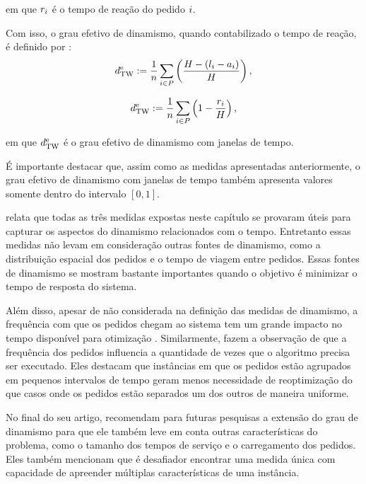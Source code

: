 \noindent em que $r_i$ é o tempo de reação do pedido
$i$.

Com isso, o grau efetivo de dinamismo, quando contabilizado o tempo de reação,
é definido por \cite{larsen_dynamic_2000}:
%
%
\begin{equation}
  d^\text{e}_\text{TW} := 
  \frac{1}{n}
  \sum_{i \in P}
  {
    \left(
    \frac{H - (l_i
                             - a_i)}
         {H}
    \right),
  }
\end{equation}

\begin{equation}
  d^\text{e}_\text{TW} := 
  \frac{1}{n}
  \sum_{i \in P}
  {
    \left(
      1 - \frac{r_i}{H}
    \right),
  }
\end{equation}

\noindent em que $d^\text{e}_\text{TW}$ é o grau efetivo de dinamismo com 
janelas de tempo.

É importante destacar que, assim como as medidas apresentadas anteriormente, o
grau efetivo de dinamismo com janelas de tempo também apresenta valores somente
dentro do intervalo $[0, 1]$.

 relata que todas as três medidas expostas neste
capítulo se provaram úteis para capturar os aspectos do dinamismo relacionados
com o tempo.
Entretanto essas medidas não levam em consideração outras fontes de dinamismo,
como a distribuição espacial dos pedidos e o tempo de viagem entre pedidos.
Essas fontes de dinamismo se mostram bastante importantes quando o objetivo é
minimizar o tempo de resposta do sistema.

Além disso, apesar de não considerada na definição das medidas de dinamismo, a
frequência com que os pedidos chegam ao sistema tem um grande impacto no tempo
disponível para otimização \cite{pillac_review_2013}.
Similarmente,  fazem a observação de que a
frequência dos pedidos influencia a quantidade de vezes que o algoritmo
precisa ser executado.
Eles destacam que instâncias em que os pedidos estão agrupados em
pequenos intervalos de tempo geram menos necessidade de reoptimização do que
casos onde os pedidos estão separados um dos outros de maneira uniforme.

No final do seu artigo,  recomendam
para futuras pesquisas a extensão do grau de dinamismo para que ele também 
leve em conta outras características do problema, como o tamanho dos tempos de 
serviço e o carregamento dos pedidos.
Eles também mencionam que é desafiador encontrar uma medida única com
capacidade de apreender múltiplas características de uma instância.

